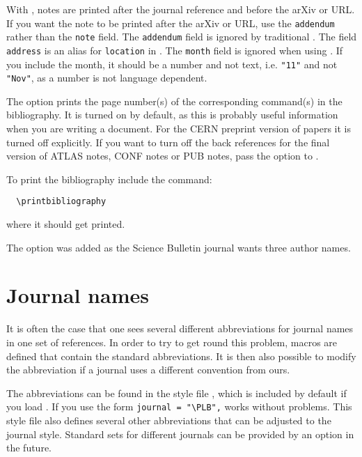 \documentclass[REPORT=false, UKenglish]{atlasdoc}
\begin{document}
With , notes are printed after the journal reference and before the arXiv or URL.
If you want the note to be printed after the arXiv or URL, use the \texttt{addendum} rather than the \texttt{note} field.
The \texttt{addendum} field is ignored by traditional \BibTeX.
The field \texttt{address} is an alias for \texttt{location} in .
The \texttt{month} field is ignored when using .
If you include the month, it should be a number and not text,
i.e. \verb|"11"| and not \verb|"Nov"|,
as a number is not language dependent.

The  option prints the page number(s) of the corresponding  command(s)
in the bibliography.
It is turned on by default, as this is probably useful information
when you are writing a document.
For the CERN preprint version of papers it is turned off explicitly.
If you want to turn off the back references for the final version of ATLAS notes,
CONF notes or PUB notes, pass the option  to .

To print the bibliography include the command:
%
\begin{verbatim}
  \printbibliography
\end{verbatim}
%
where it should get printed.

 The  option was added as the Science Bulletin
journal wants three author names.

\section{Journal names}

It is often the case that one sees several different abbreviations for journal
names in one set of references.
In order to try to get round this problem, macros are defined that
contain the standard abbreviations.
It is then also possible to modify the abbreviation if a journal uses a different convention from ours.

The abbreviations can be found in the style file ,
which is included by default if you load .
If you use  the form \verb|journal = "\PLB",| works without problems.
This style file also defines several other abbreviations that can be adjusted to the
journal style.
Standard sets for different journals can be provided by an option in the future.
\end{document}
